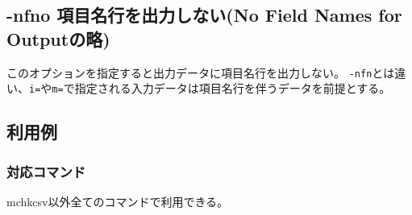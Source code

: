 
%

\subsection{-nfno 項目名行を出力しない(No Field Names for Outputの略)\label{sect:option_nfno}}
このオプションを指定すると出力データに項目名行を出力しない。
\verb|-nfn|とは違い、\verb|i=|や\verb|m=|で指定される入力データは項目名行を伴うデータを前提とする。

\subsection*{利用例}


\subsubsection*{対応コマンド}
mchkcsv以外全てのコマンドで利用できる。

%

